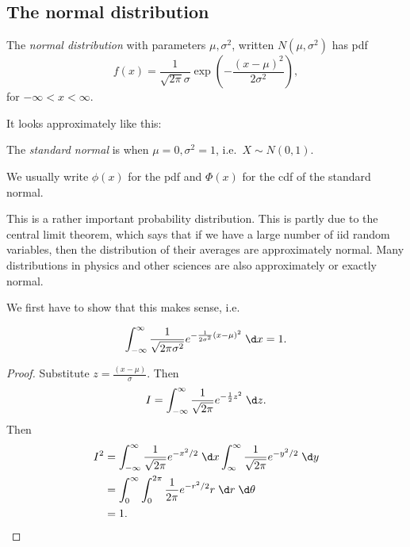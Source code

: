 \documentclass[a4paper]{article}
\begin{document}
\subsection{The normal distribution}
\begin{defi}
  The \emph{normal distribution} with parameters $\mu, \sigma^2$, written $N(\mu, \sigma^2)$ has pdf
  \[
    f(x) = \frac{1}{\sqrt{2 \pi}\sigma}\exp\left(-\frac{(x - \mu)^2}{2\sigma^2}\right),
  \]
  for $-\infty < x < \infty$.

  It looks approximately like this:
  \begin{center}
  \end{center}
  The \emph{standard normal} is when $\mu = 0, \sigma^2 = 1$, i.e.\ $X\sim N(0, 1)$.

  We usually write $\phi(x)$ for the pdf and $\Phi(x)$ for the cdf of the standard normal.
\end{defi}
This is a rather important probability distribution. This is partly due to the central limit theorem, which says that if we have a large number of iid random variables, then the distribution of their averages are approximately normal. Many distributions in physics and other sciences are also approximately or exactly normal.

We first have to show that this makes sense, i.e.
\begin{prop}
  \[
    \int_{-\infty}^\infty \frac{1}{\sqrt{2\pi \sigma^2}} e^{-\frac{1}{2\sigma^2}(x - \mu)^2}\;\d x = 1.
  \]
\end{prop}
\begin{proof}
  Substitute $z = \frac{(x - \mu)}{\sigma}$. Then
  \[
    I = \int_{-\infty}^\infty \frac{1}{\sqrt{2\pi}}e^{-\frac{1}{2}z^2}\;\d z.
  \]
  Then
  \begin{align*}
    I^2 &= \int_{-\infty}^\infty \frac{1}{\sqrt{2\pi}} e^{-x^2/2}\;\d x\int_{\infty}^\infty \frac{1}{\sqrt{2\pi}} e^{-y^2/2}\;\d y\\
    &= \int_0^\infty \int_0^{2\pi}\frac{1}{2\pi}e^{-r^2/2}r\;\d r\;\d \theta\\
    &= 1.\qedhere
  \end{align*}
\end{proof}
\end{document}
